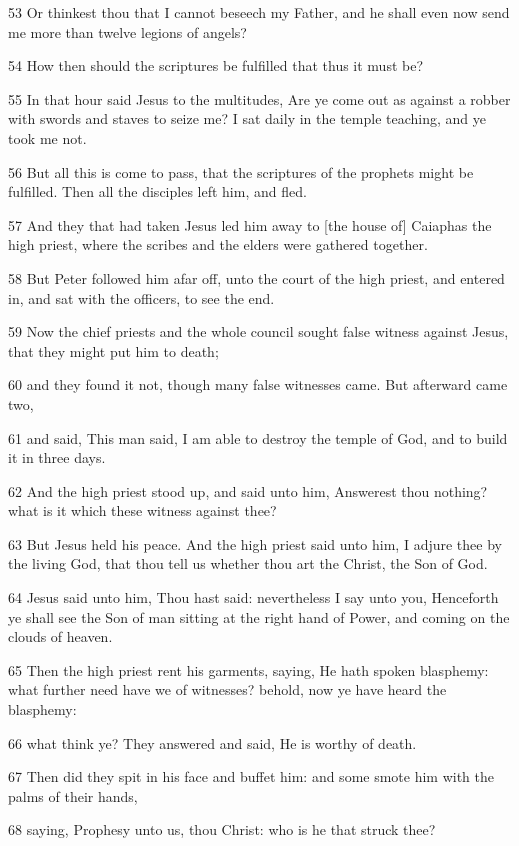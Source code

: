 \par 53 Or thinkest thou that I cannot beseech my Father, and he shall even now send me more than twelve legions of angels?
\par 54 How then should the scriptures be fulfilled that thus it must be?
\par 55 In that hour said Jesus to the multitudes, Are ye come out as against a robber with swords and staves to seize me? I sat daily in the temple teaching, and ye took me not.
\par 56 But all this is come to pass, that the scriptures of the prophets might be fulfilled. Then all the disciples left him, and fled.
\par 57 And they that had taken Jesus led him away to [the house of] Caiaphas the high priest, where the scribes and the elders were gathered together.
\par 58 But Peter followed him afar off, unto the court of the high priest, and entered in, and sat with the officers, to see the end.
\par 59 Now the chief priests and the whole council sought false witness against Jesus, that they might put him to death;
\par 60 and they found it not, though many false witnesses came. But afterward came two,
\par 61 and said, This man said, I am able to destroy the temple of God, and to build it in three days.
\par 62 And the high priest stood up, and said unto him, Answerest thou nothing? what is it which these witness against thee?
\par 63 But Jesus held his peace. And the high priest said unto him, I adjure thee by the living God, that thou tell us whether thou art the Christ, the Son of God.
\par 64 Jesus said unto him, Thou hast said: nevertheless I say unto you, Henceforth ye shall see the Son of man sitting at the right hand of Power, and coming on the clouds of heaven.
\par 65 Then the high priest rent his garments, saying, He hath spoken blasphemy: what further need have we of witnesses? behold, now ye have heard the blasphemy:
\par 66 what think ye? They answered and said, He is worthy of death.
\par 67 Then did they spit in his face and buffet him: and some smote him with the palms of their hands,
\par 68 saying, Prophesy unto us, thou Christ: who is he that struck thee?
